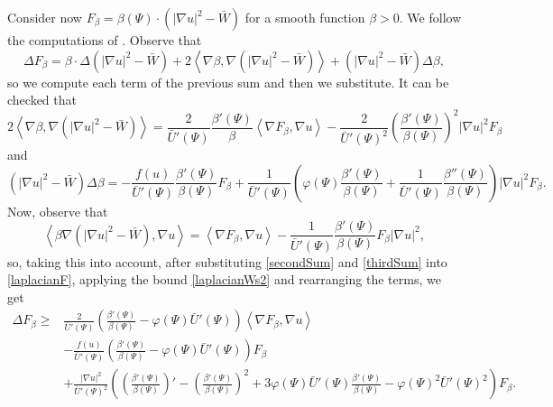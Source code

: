 \documentclass[11pt]{article}
\newcommand{\abs}[1]{\left\vert #1 \right\vert}
\newcommand{\pscalar}[2]{\left\langle #1, #2 \right\rangle}
\numberwithin{equation} {section}
\begin{document}
Consider now $F_\beta = \beta (\Psi) \cdot (\abs{\nabla u}^2-\bar{W})$ for a smooth function $\beta >0$. We follow the computations of \cite{EMa}. Observe that
\begin{equation}\label{laplacianF}
	\Delta F_{\beta} = \beta \cdot \Delta (\abs{\nabla u}^2-\bar{W}) + 2 \pscalar{\nabla \beta}{\nabla (\abs{\nabla u}^2-\bar{W})} +   (\abs{\nabla u}^2-\bar W) \Delta \beta,
\end{equation}
so we compute each term of the previous sum and then we substitute. It can be checked that
\begin{equation}\label{secondSum}
	2 \pscalar{\nabla \beta}{\nabla (\abs{\nabla u}^2-\bar{W})} = \frac{2}{\bar{U}' (\Psi)} \frac{\beta ' (\Psi)}{\beta} \pscalar{\nabla F_\beta}{\nabla u}-\frac{2}{\bar{U}' (\Psi)^2} \left(\frac{\beta ' (\Psi)}{\beta (\Psi)}\right)^2  \abs{\nabla u}^2 F_\beta
\end{equation}
and
\begin{equation}\label{thirdSum}
	(\abs{\nabla u}^2-\bar{W}) \Delta \beta = -\frac{f(u)}{\bar{U}' (\Psi)} \frac{\beta ' (\Psi)}{\beta (\Psi)} F_\beta + \frac{1}{\bar{U}' (\Psi)} \left( \varphi (\Psi) \frac{\beta ' (\Psi)}{\beta (\Psi)}+  \frac{1}{\bar{U}' (\Psi)} \frac{\beta '' (\Psi)}{\beta (\Psi)} \right) \abs{\nabla u}^2 F_\beta.
\end{equation}
Now, observe that
\[
\pscalar{\beta \nabla (\abs{\nabla u}^2-\bar{W})}{\nabla u}= \pscalar{\nabla F_\beta}{\nabla u}-\frac{1}{\bar{U}' (\Psi)}\frac{\beta ' (\Psi)}{\beta (\Psi)} F_\beta \abs{\nabla u}^2,
\]
so, taking this into account, after substituting \eqref{secondSum} and \eqref{thirdSum} into \eqref{laplacianF}, applying the bound \eqref{laplacianWs2} and rearranging the terms, we get
\begin{equation*}
	\begin{split}
		\Delta F_\beta \geq & \frac{2}{\bar{U}' (\Psi)} \left( \frac{\beta ' (\Psi)}{\beta (\Psi)}-\varphi (\Psi) \bar{U}' (\Psi) \right) \pscalar{\nabla F_\beta}{\nabla u} \\
		&-\frac{f(u)}{\bar{U}' (\Psi)} \left( \frac{\beta ' (\Psi)}{\beta (\Psi)}-  \varphi (\Psi) \bar{U}' (\Psi) \right) F_\beta \\
		&+\frac{\abs{\nabla u}^2}{\bar{U}' (\Psi)^2} \left( \left(  \frac{\beta ' (\Psi)}{\beta (\Psi)} \right)' - \left( \frac{\beta ' (\Psi)}{\beta (\Psi)}\right)^2 + 3 \varphi (\Psi) \bar{U}' (\Psi)  \frac{\beta ' (\Psi)}{\beta (\Psi)}- \varphi (\Psi)^2 \bar{U}' (\Psi)^2 \right) F_\beta.
	\end{split}
\end{equation*}
\end{document}
